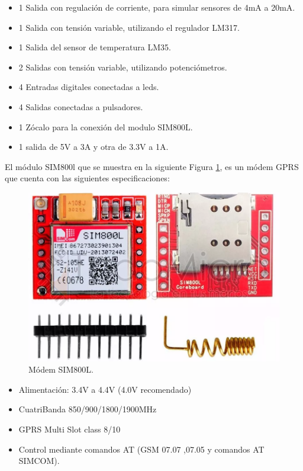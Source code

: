 \begin{itemize}
  \item 1 Salida con regulación de corriente, para simular sensores de 4mA a 20mA.
  \item 1 Salida con tensión variable, utilizando el regulador LM317.
  \item 1 Salida del sensor de temperatura LM35.
  \item 2 Salidas con tensión variable, utilizando potenciómetros. 
  \item 4 Entradas digitales conectadas a leds.
  \item 4 Salidas conectadas a pulsadores. 
  \item 1 Zócalo para la conexión del modulo SIM800L. 
  \item 1 salida de 5V a 3A y otra de 3.3V a 1A. 
\end{itemize}

El módulo SIM800l que se muestra en la siguiente Figura \ref{fig:sim800l}, es un módem GPRS que cuenta con las siguientes especificaciones:

\begin{figure}[!htb]
  \centering
  \includegraphics[scale=0.2]{./Figures/sim800.png}
  \caption{Módem SIM800L.}
  \label{fig:sim800l}
\end{figure}

\begin{itemize}
  \item Alimentación: 3.4V a 4.4V (4.0V recomendado)
  \item  CuatriBanda 850/900/1800/1900MHz
  \item  GPRS Multi Slot class 8/10
  \item  Control mediante comandos AT (GSM 07.07 ,07.05 y comandos AT SIMCOM).
\end{itemize}


